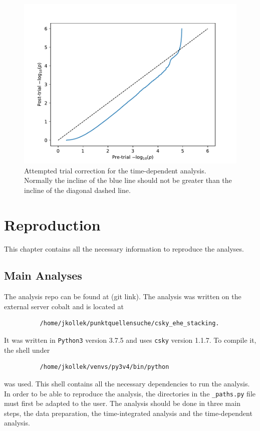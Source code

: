 \begin{figure}
    \centering
    \includegraphics[width=\linewidth]{Plots/appendix/post_trial_p_values_1.pdf}
    \caption{Attempted trial correction for the time-dependent analysis. Normally the incline of the blue line should not be greater than the incline of the diagonal dashed line.}
    \label{fig:post_trials}
\end{figure}

\chapter{Reproduction}

This chapter contains all the necessary information to reproduce the analyses.

\section{Main Analyses}

The analysis repo can be found at (git link).
The analysis was written on the external server cobalt and is located at
\begin{verbatim}
          /home/jkollek/punktquellensuche/csky_ehe_stacking.
\end{verbatim}
It was written in \texttt{Python3} version 3.7.5 and uses \texttt{csky} version 1.1.7.
To compile it, the shell under
\begin{verbatim}
          /home/jkollek/venvs/py3v4/bin/python
\end{verbatim}
was used.
This shell contains all the necessary dependencies to run the analysis.
In order to be able to reproduce the analysis, the directories in the \texttt{\_paths.py} file must first be adapted to the user.
The analysis should be done in three main steps, the data preparation, the time-integrated analysis and the time-dependent analysis.

